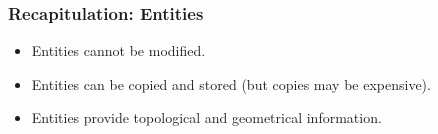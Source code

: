 \documentclass[aspectratio=169,11pt]{beamer}
\theoremstyle{definition}
\begin{document}
\begin{frame} \frametitle{Recapitulation: Entities}



  \begin{itemize}
  \item Entities cannot be modified.
  \item Entities can be copied and stored (but copies may be expensive).
  \item Entities provide topological and geometrical information.
  \end{itemize}
\end{frame}
\end{document}
